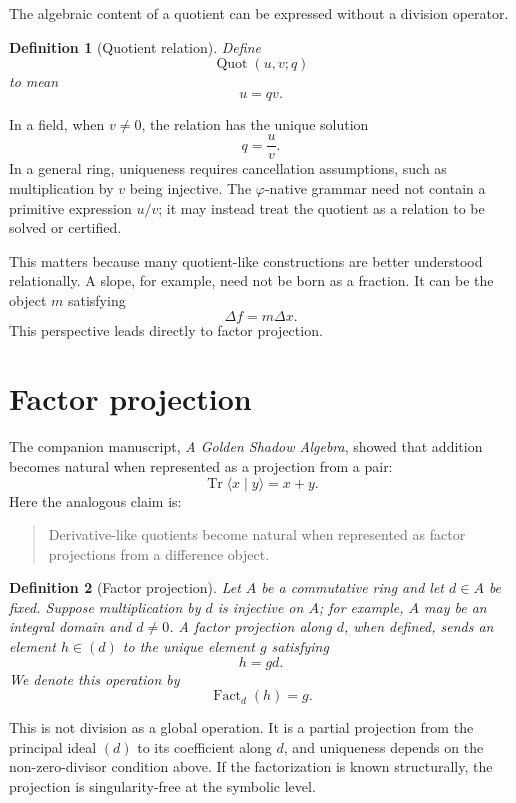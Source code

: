 \documentclass[11pt]{article}
\newtheorem{definition}{Definition}[section]
\newcommand{\Tr}{\operatorname{Tr}}
\newcommand{\Quot}{\operatorname{Quot}}
\newcommand{\Fact}{\operatorname{Fact}}
\newcommand{\ph}{\varphi}
\begin{document}
The algebraic content of a quotient can be expressed without a division operator.

\begin{definition}[Quotient relation]
Define
\[
    \Quot(u,v;q)
\]
to mean
\[
    u=qv.
\]
\end{definition}

In a field, when $v\ne0$, the relation has the unique solution
\[
    q=\frac{u}{v}.
\]
In a general ring, uniqueness requires cancellation assumptions, such as multiplication by $v$ being injective.  The $\ph$-native grammar need not contain a primitive expression $u/v$; it may instead treat the quotient as a relation to be solved or certified.

This matters because many quotient-like constructions are better understood relationally.  A slope, for example, need not be born as a fraction.  It can be the object $m$ satisfying
\[
    \Delta f=m\Delta x.
\]
This perspective leads directly to factor projection.

\section{Factor projection}

The companion manuscript, \emph{A Golden Shadow Algebra}, showed that addition becomes natural when represented as a projection from a pair:
\[
    \Tr\langle x\mid y\rangle=x+y.
\]
Here the analogous claim is:
\begin{quote}
Derivative-like quotients become natural when represented as factor projections from a difference object.
\end{quote}

\begin{definition}[Factor projection]
Let $A$ be a commutative ring and let $d\in A$ be fixed.  Suppose multiplication by $d$ is injective on $A$; for example, $A$ may be an integral domain and $d\ne0$.  A factor projection along $d$, when defined, sends an element $h\in (d)$ to the unique element $g$ satisfying
\[
    h=gd.
\]
We denote this operation by
\[
    \Fact_d(h)=g.
\]
\end{definition}

This is not division as a global operation.  It is a partial projection from the principal ideal $(d)$ to its coefficient along $d$, and uniqueness depends on the non-zero-divisor condition above.  If the factorization is known structurally, the projection is singularity-free at the symbolic level.
\end{document}
